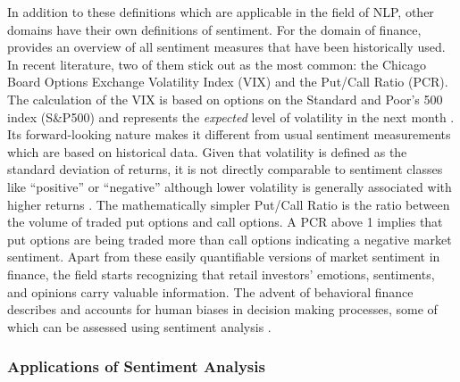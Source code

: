 In addition to these definitions which are applicable in the field of NLP, other domains have their own definitions of sentiment. For the domain of finance,  provides an overview of all sentiment measures that have been historically used. In recent literature, two of them stick out as the most common: the Chicago Board Options Exchange Volatility Index (VIX) and the Put/Call Ratio (PCR). The calculation of the VIX is based on options on the Standard and Poor's 500 index (S\&P500) and represents the \emph{expected} level of volatility in the next month . Its forward-looking nature makes it different from usual sentiment measurements which are based on historical data. Given that volatility is defined as the standard deviation of returns, it is not directly comparable to sentiment classes like ``positive'' or ``negative'' although lower volatility is generally associated with higher returns . The mathematically simpler Put/Call Ratio is the ratio between the volume of traded put options and call options. A PCR above 1 implies that put options are being traded more than call options indicating a negative market sentiment. Apart from these easily quantifiable versions of market sentiment in finance, the field starts recognizing that retail investors' emotions, sentiments, and opinions carry valuable information. The advent of behavioral finance describes and accounts for human biases in decision making processes, some of which can be assessed using sentiment analysis .


\subsubsection{Applications of Sentiment Analysis}


